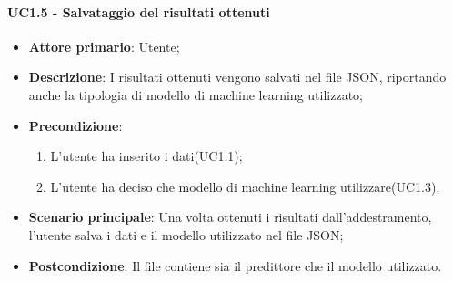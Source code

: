 \paragraph{UC1.5 - Salvataggio del risultati ottenuti}
\label{para:uc1.5}
\begin{itemize}
  \item \textbf{Attore primario}: Utente;
  \item \textbf{Descrizione}: I risultati ottenuti vengono salvati nel file JSON, riportando anche la tipologia di modello di machine learning utilizzato;
  \item \textbf{Precondizione}:
  \begin{enumerate}
    \item L'utente ha inserito i dati(UC1.1);
    \item L'utente ha deciso che modello di machine learning  utilizzare(UC1.3).
  \end{enumerate}
  \item \textbf{Scenario principale}: Una volta ottenuti i risultati dall'addestramento, l'utente salva i dati e il modello utilizzato nel file JSON;
  \item \textbf{Postcondizione}: Il file contiene sia il predittore che il modello utilizzato.
\end{itemize}

